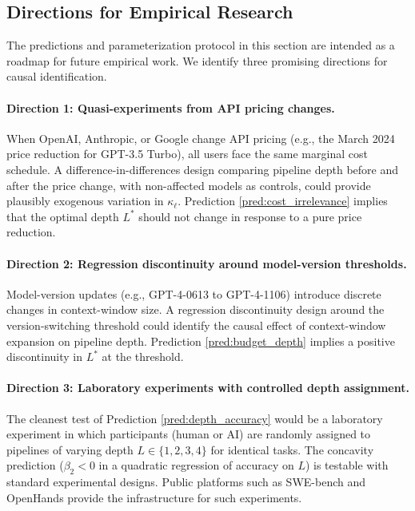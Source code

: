 \subsection{Directions for Empirical Research}
\label{subsec:directions}

The predictions and parameterization protocol in this section are intended as a roadmap for future empirical work. We identify three promising directions for causal identification.

\paragraph{Direction 1: Quasi-experiments from API pricing changes.} When OpenAI, Anthropic, or Google change API pricing (e.g., the March 2024 price reduction for GPT-3.5 Turbo), all users face the same marginal cost schedule. A difference-in-differences design comparing pipeline depth before and after the price change, with non-affected models as controls, could provide plausibly exogenous variation in $\kappa_\ell$. Prediction \ref{pred:cost_irrelevance} implies that the optimal depth $L^*$ should not change in response to a pure price reduction.

\paragraph{Direction 2: Regression discontinuity around model-version thresholds.} Model-version updates (e.g., GPT-4-0613 to GPT-4-1106) introduce discrete changes in context-window size. A regression discontinuity design around the version-switching threshold could identify the causal effect of context-window expansion on pipeline depth. Prediction \ref{pred:budget_depth} implies a positive discontinuity in $L^*$ at the threshold.

\paragraph{Direction 3: Laboratory experiments with controlled depth assignment.} The cleanest test of Prediction \ref{pred:depth_accuracy} would be a laboratory experiment in which participants (human or AI) are randomly assigned to pipelines of varying depth $L \in \{1, 2, 3, 4\}$ for identical tasks. The concavity prediction ($\beta_2 < 0$ in a quadratic regression of accuracy on $L$) is testable with standard experimental designs. Public platforms such as SWE-bench \citep{jimenez2024swe} and OpenHands \citep{wang2024openhands} provide the infrastructure for such experiments.

